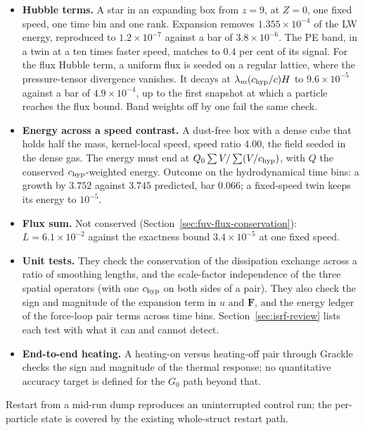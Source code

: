 \begin{itemize}
    speed with particles on many time bins (bin gap $4$), on 1, 4 and 8
    ranks. Criterion: the $c_{\rm hyp}$-weighted energy ledger residual
    (field energy plus absorbed minus injected energy, over the injected
    energy) below $n_{\rm steps}\,2^{-23}$. Outcome: at most
    $5.2\times10^{-8}$ against $3.8\times10^{-5}$. A build without the
    extra visits that reach the cross-rank pairs reads about $10^{-2}$ on
    the same check.
  \item \textbf{Hubble terms.} A star in an expanding box from $z = 9$,
    at $Z = 0$, one fixed speed, one time bin and one rank. Expansion
    removes $1.355\times10^{-4}$ of the LW energy, reproduced to
    $1.2\times10^{-7}$ against a bar of $3.8\times10^{-6}$. The PE band,
    in a twin at a ten times faster speed, matches to $0.4$ per cent of
    its signal. For the flux Hubble term, a uniform flux is seeded on a
    regular lattice, where the pressure-tensor divergence vanishes. It
    decays at $\lambda_m (c_{\rm hyp}/c)H$ to $9.6\times10^{-5}$ against a
    bar of $4.9\times10^{-4}$, up to the first snapshot at which a
    particle reaches the flux bound. Band weights off by one fail the
    same check.
  \item \textbf{Energy across a speed contrast.} A dust-free box with a
    dense cube that holds half the mass, kernel-local speed, speed ratio
    $4.00$, the field seeded in the dense gas. The energy must end at
    $Q_0\sum V/\sum(V/c_{\rm hyp})$, with $Q$ the conserved
    $c_{\rm hyp}$-weighted energy. Outcome on the hydrodynamical time
    bins: a growth by $3.752$ against $3.745$ predicted, bar $0.066$; a
    fixed-speed twin keeps its energy to $10^{-5}$.
  \item \textbf{Flux sum.} Not conserved
    (Section~\ref{sec:fuv-flux-conservation}): $L = 6.1\times10^{-2}$
    against the exactness bound $3.4\times10^{-5}$ at one fixed speed.
  \item \textbf{Unit tests.} They check the conservation of the
    dissipation exchange across a ratio of smoothing lengths, and the
    scale-factor independence of the three spatial operators (with one
    $c_{\rm hyp}$ on both sides of a pair). They also check the sign and
    magnitude of the expansion term in $u$ and $\mathbf F$, and the energy
    ledger of the force-loop pair terms across time bins.
    Section~\ref{sec:isrf-review} lists each test with what it can and
    cannot detect.
  \item \textbf{End-to-end heating.} A heating-on versus heating-off
    pair through Grackle checks the sign and magnitude of the thermal
    response; no quantitative accuracy target is defined for the $G_0$
    path beyond that.
\end{itemize}
Restart from a mid-run dump reproduces an uninterrupted control run;
the per-particle state is covered by the existing whole-struct restart
path.

